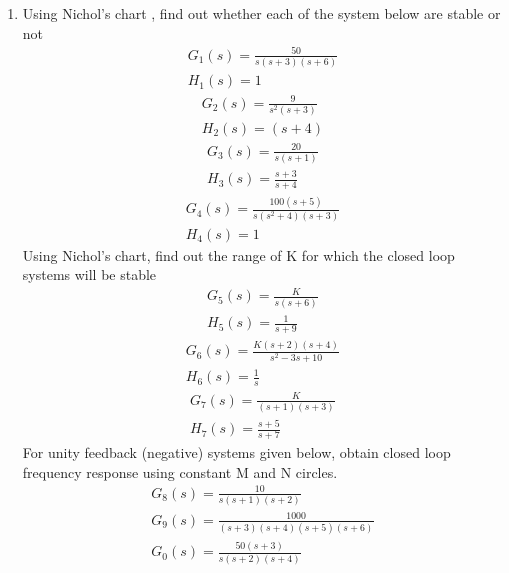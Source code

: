 \begin{enumerate}[label=\thesection.\arabic*.,ref=\thesection.\theenumi]
\item Using Nichol's chart , find out whether each of the system below are stable or not 
\begin{align}
G_1(s)= \frac{50}{s(s+3)(s+6)}
\label{eq:es17btech11009_a}
\\
 H_1(s)= 1
 \label{eq:es17btech11009_b}
\end{align}
\begin{align}
G_2(s)= \frac{9}{s^2(s+3)}
\label{eq:es17btech11009_c}
\\
 H_2(s)= (s+4)
 \label{eq:es17btech11009_d}
\end{align}
\begin{align}
G_3(s)= \frac{20}{s(s+1)}
\label{eq:es17btech11009_e}
\\
 H_3(s)= \frac{s+3}{s+4}
 \label{eq:es17btech11009_f}
\end{align}
\begin{align}
G_4(s)= \frac{100(s+5)}{s(s^2+4)(s+3)}
\label{eq:es17btech11009_g}
\\
 H_4(s)= 1
 \label{eq:es17btech11009_h}
\end{align}
Using Nichol's chart, find out the range of K for which the closed loop systems will be stable
\begin{align}
G_5(s)= \frac{K}{s(s+6)}
\label{eq:es17btech11009_i}
\\
 H_5(s)= \frac{1}{s+9}
 \label{eq:es17btech11009_j}
\end{align}
\begin{align}
G_6(s)= \frac{K(s+2)(s+4)}{s^2 - 3s +10}
\label{eq:es17btech11009_k}
\\
 H_6(s)= \frac{1}{s}
 \label{eq:es17btech11009_l}
\end{align}
\begin{align}
G_7(s)= \frac{K}{(s+1)(s+3)}
\label{eq:es17btech11009_m}
\\
 H_7(s)= \frac{s+5}{s+7}
 \label{eq:es17btech11009_n}
\end{align}
For unity feedback (negative) systems given below, obtain closed loop frequency response using constant M and N circles.
\begin{align}
G_8(s)= \frac{10}{s(s+1)(s+2)}
 \label{eq:es17btech11009_o}
 \\
G_9(s)= \frac{1000}{(s+3)(s+4)(s+5)(s+6)}
\label{eq:es17btech11009_p}
\\
G_0(s)= \frac{50(s+3)}{s(s+2)(s+4)}
\label{eq:es17btech11009_q}

\end{align}
\end{enumerate}

